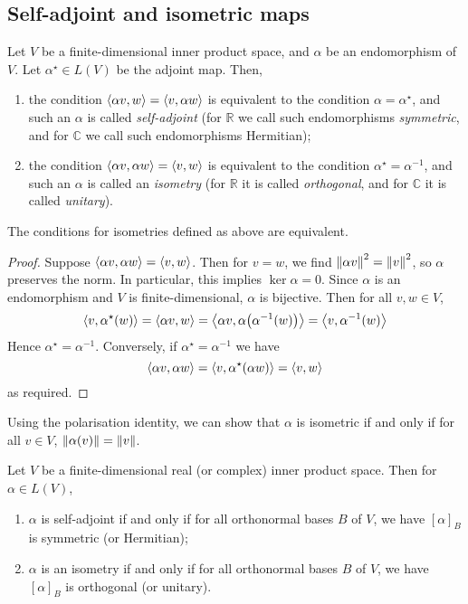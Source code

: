 \subsection{Self-adjoint and isometric maps}
\begin{definition}
	Let \( V \) be a finite-dimensional inner product space, and \( \alpha \) be an endomorphism of \( V \).
	Let \( \alpha^\star \in L(V) \) be the adjoint map.
	Then,
	\begin{enumerate}
		\item the condition \( \left\langle{\alpha v, w}\right\rangle = \left\langle{v, \alpha w}\right\rangle \) is equivalent to the condition \( \alpha = \alpha^\star \), and such an \( \alpha \) is called \textit{self-adjoint} (for \( \mathbb R \) we call such endomorphisms \textit{symmetric}, and for \( \mathbb C \) we call such endomorphisms Hermitian);
		\item the condition \( \left\langle{\alpha v, \alpha w}\right\rangle = \left\langle{v, w}\right\rangle \) is equivalent to the condition \( \alpha^\star = \alpha^{-1} \), and such an \( \alpha \) is called an \textit{isometry} (for \( \mathbb R \) it is called \textit{orthogonal}, and for \( \mathbb C \) it is called \textit{unitary}).
	\end{enumerate}
\end{definition}
\begin{proposition}
	The conditions for isometries defined as above are equivalent.
\end{proposition}
\begin{proof}
	Suppose \( \left\langle{\alpha v, \alpha w}\right\rangle = \left\langle{v,w}\right\rangle \).
	Then for \( v = w \), we find \( \norm{\alpha v}^2 = \norm{v}^2 \), so \( \alpha \) preserves the norm.
	In particular, this implies \( \ker \alpha = \qty{0} \).
	Since \( \alpha \) is an endomorphism and \( V \) is finite-dimensional, \( \alpha \) is bijective.
	Then for all \( v, w \in V \),
	\[
		\left\langle{v, \alpha^\star(w)}\right\rangle = \left\langle{\alpha v, w}\right\rangle = \left\langle{\alpha v, \alpha\qty(\alpha^{-1}(w))}\right\rangle = \left\langle{v, \alpha^{-1}(w)}\right\rangle
	\]
	Hence \( \alpha^\star = \alpha^{-1} \).
	Conversely, if \( \alpha^\star = \alpha^{-1} \) we have
	\[
		\left\langle{\alpha v, \alpha w}\right\rangle = \left\langle{v, \alpha^\star(\alpha w)}\right\rangle = \left\langle{v, w}\right\rangle
	\]
	as required.
\end{proof}
\begin{remark}
	Using the polarisation identity, we can show that \( \alpha \) is isometric if and only if for all \( v \in V \), \( \norm{\alpha(v)} = \norm{v} \).
\end{remark}
\begin{lemma}
	Let \( V \) be a finite-dimensional real (or complex) inner product space.
	Then for \( \alpha \in L(V) \),
	\begin{enumerate}
		\item \( \alpha \) is self-adjoint if and only if for all orthonormal bases \( B \) of \( V \), we have \( [\alpha]_B \) is symmetric (or Hermitian);
		\item \( \alpha \) is an isometry if and only if for all orthonormal bases \( B \) of \( V \), we have \( [\alpha]_B \) is orthogonal (or unitary).
	\end{enumerate}
\end{lemma}
